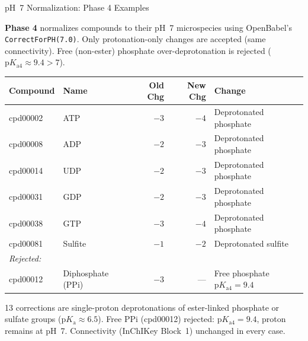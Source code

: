 \documentclass[aspectratio=169,11pt]{beamer}
\begin{document}
\begin{frame}{pH~7 Normalization: Phase 4 Examples}

\textbf{Phase 4} normalizes compounds to their pH~7 microspecies using
OpenBabel's \texttt{CorrectForPH(7.0)}. Only protonation-only changes
are accepted (same connectivity). Free (non-ester) phosphate
over-deprotonation is rejected ($\text{p}K_{\text{a}4} \approx 9.4 > 7$).

\medskip
\begin{table}[h]
\centering
\footnotesize
\begin{tabular}{llrrl}
\toprule
\textbf{Compound} & \textbf{Name} & \textbf{Old Chg} & \textbf{New Chg} & \textbf{Change} \\
\midrule
cpd00002 & ATP              & $-3$ & $-4$ & Deprotonated phosphate \\
cpd00008 & ADP              & $-2$ & $-3$ & Deprotonated phosphate \\
cpd00014 & UDP              & $-2$ & $-3$ & Deprotonated phosphate \\
cpd00031 & GDP              & $-2$ & $-3$ & Deprotonated phosphate \\
cpd00038 & GTP              & $-3$ & $-4$ & Deprotonated phosphate \\
cpd00081 & Sulfite          & $-1$ & $-2$ & Deprotonated sulfite \\
\midrule
\multicolumn{5}{l}{\textit{Rejected:}} \\
cpd00012 & Diphosphate (PPi) & $-3$ & --- & Free phosphate $\text{p}K_{\text{a}4}{=}9.4$ \\
\bottomrule
\end{tabular}
\end{table}

\smallskip
\footnotesize
13 corrections are single-proton deprotonations of ester-linked phosphate or
sulfate groups ($\text{p}K_\text{a} \approx 6.5$).
Free PPi (cpd00012) rejected: $\text{p}K_{\text{a}4}{=}9.4$, proton remains at pH~7.
Connectivity (InChIKey Block~1) unchanged in every case.

\end{frame}
\end{document}
